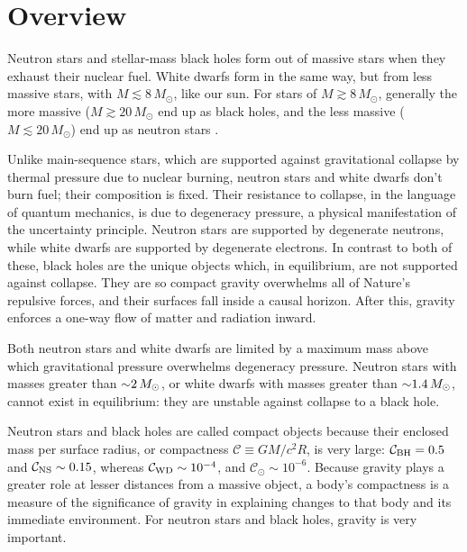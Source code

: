 \chapter{Overview}
\label{chap:overview}

Neutron stars and stellar-mass black holes form out of massive stars when they
exhaust their nuclear fuel. White dwarfs form in the same way, but from less
massive stars, with $M\lesssim 8\,M_{\odot}$, like our sun.
For stars of $M\gtrsim 8\,M_{\odot}$, generally the more massive
($M\gtrsim 20\,M_{\odot}$ end up as black holes, and the less massive
($M\lesssim 20\,M_{\odot}$) end up as neutron stars
\citep{woos2002-review_stellar_evolution}.

Unlike main-sequence stars, which are supported against gravitational collapse
by thermal pressure due to nuclear burning, neutron stars and white dwarfs
don't burn fuel; their composition is fixed.
Their resistance to collapse, in the language of quantum mechanics, is due
to degeneracy pressure, a physical manifestation of the uncertainty principle.
Neutron stars are supported by degenerate neutrons, while white dwarfs are
supported by degenerate electrons. In contrast to both of these, black holes
are the unique objects which, in equilibrium, are not supported against
collapse. They are so compact gravity overwhelms all of Nature's repulsive
forces, and their surfaces fall inside a causal horizon. After this, gravity
enforces a one-way flow of matter and radiation inward.

Both neutron stars and white dwarfs are limited by a maximum mass above which
gravitational pressure overwhelms degeneracy pressure. Neutron stars with masses
greater than $\mathord{\sim}2\,M_\odot$, or white dwarfs with masses greater than
$\mathord{\sim}1.4\,M_\odot$, cannot exist in equilibrium: they are unstable against
collapse to a black hole.

Neutron stars and black holes are called compact objects because their enclosed
mass per surface radius, or compactness $\mathcal{C}\equiv G M/c^2 R$, is very
large:
$\mathcal{C}_{\rm BH}=0.5$ and
$\mathcal{C}_{\rm NS}\sim0.15$,
whereas $\mathcal{C}_{\rm WD}\sim10^{-4}$, and $\mathcal{C}_{\odot}\sim10^{-6}$.
Because gravity plays a greater role at lesser distances from a massive object,
a body's compactness is a measure of the significance of gravity
in explaining changes to that body and its immediate environment.
For neutron stars and black holes, gravity is very important.


